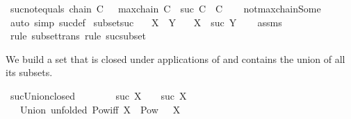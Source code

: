 \begin{isabellebody}
\endisatagproof
{\isafoldproof}%
%
\isadelimproof
\isanewline
%
\endisadelimproof
\isanewline
{}\isamarkupfalse%
\ suc{\isacharunderscore}{\kern0pt}not{\isacharunderscore}{\kern0pt}equals{\isacharcolon}{\kern0pt}\ {\isachardoublequoteopen}chain\ C\ {\isasymLongrightarrow}\ {\isasymnot}\ maxchain\ C\ {\isasymLongrightarrow}\ suc\ C\ {\isasymnoteq}\ C{\isachardoublequoteclose}\isanewline
%
\isadelimproof
\ \ %
\endisadelimproof
%
\isatagproof
{}\isamarkupfalse%
\ not{\isacharunderscore}{\kern0pt}maxchain{\isacharunderscore}{\kern0pt}Some\ \isamarkupfalse%
\ {\isacharparenleft}{\kern0pt}auto\ simp{\isacharcolon}{\kern0pt}\ suc{\isacharunderscore}{\kern0pt}def{\isacharparenright}{\kern0pt}%
\endisatagproof
{\isafoldproof}%
%
\isadelimproof
\isanewline
%
\endisadelimproof
\isanewline
{}\isamarkupfalse%
\ subset{\isacharunderscore}{\kern0pt}suc{\isacharcolon}{\kern0pt}\isanewline
\ \ \ {\isachardoublequoteopen}X\ {\isasymsubseteq}\ Y{\isachardoublequoteclose}\isanewline
\ \ \ {\isachardoublequoteopen}X\ {\isasymsubseteq}\ suc\ Y{\isachardoublequoteclose}\isanewline
%
\isadelimproof
\ \ %
\endisadelimproof
%
\isatagproof
{}\isamarkupfalse%
\ assms\ \isamarkupfalse%
\ {\isacharparenleft}{\kern0pt}rule\ subset{\isacharunderscore}{\kern0pt}trans{\isacharparenright}{\kern0pt}\ {\isacharparenleft}{\kern0pt}rule\ suc{\isacharunderscore}{\kern0pt}subset{\isacharparenright}{\kern0pt}%
\endisatagproof
{\isafoldproof}%
%
\isadelimproof
%
\endisadelimproof
%
\begin{isamarkuptext}%
We build a set \isa{{\isasymC}} that is closed under applications
  of  and contains the union of all its subsets.%
\end{isamarkuptext}\isamarkuptrue%
\isamarkupfalse%
\ suc{\isacharunderscore}{\kern0pt}Union{\isacharunderscore}{\kern0pt}closed\ {\isacharparenleft}{\kern0pt}{\isachardoublequoteopen}{\isasymC}{\isachardoublequoteclose}{\isacharparenright}{\kern0pt}\isanewline
\ \ \isanewline
\ \ \ \ suc{\isacharcolon}{\kern0pt}\ {\isachardoublequoteopen}X\ {\isasymin}\ {\isasymC}\ {\isasymLongrightarrow}\ suc\ X\ {\isasymin}\ {\isasymC}{\isachardoublequoteclose}\isanewline
\ \ {\isacharbar}{\kern0pt}\ Union\ {\isacharbrackleft}{\kern0pt}unfolded\ Pow{\isacharunderscore}{\kern0pt}iff{\isacharbrackright}{\kern0pt}{\isacharcolon}{\kern0pt}\ {\isachardoublequoteopen}X\ {\isasymin}\ Pow\ {\isasymC}\ {\isasymLongrightarrow}\ {\isasymUnion}X\ {\isasymin}\ {\isasymC}{\isachardoublequoteclose}%

\end{isabellebody}
